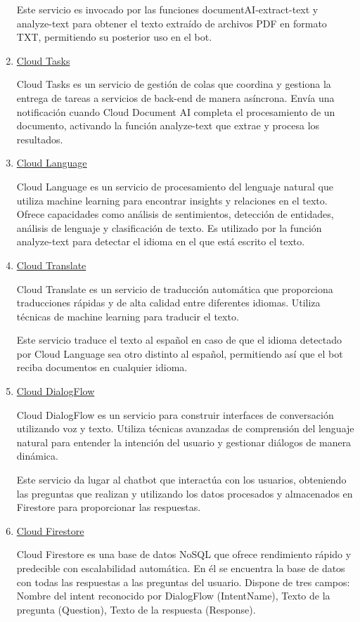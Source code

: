 \begin{enumerate}
    Este servicio es invocado por las funciones documentAI-extract-text y analyze-text para obtener el texto extraído de archivos PDF en formato TXT, permitiendo su posterior uso en el bot.
    
    \item \underline{Cloud Tasks}
    
    Cloud Tasks es un servicio de gestión de colas que coordina y gestiona la entrega de tareas a servicios de back-end de manera asíncrona. Envía una notificación cuando Cloud Document AI completa el procesamiento de un documento, activando la función analyze-text que extrae y procesa los resultados.
    
    \item \underline{Cloud Language}
    
    Cloud Language es un servicio de procesamiento del lenguaje natural que utiliza machine learning para encontrar insights y relaciones en el texto. Ofrece capacidades como análisis de sentimientos, detección de entidades, análisis de lenguaje y clasificación de texto. Es utilizado por la función analyze-text para detectar el idioma en el que está escrito el texto.
    
    \item \underline{Cloud Translate}
    
    Cloud Translate es un servicio de traducción automática que proporciona traducciones rápidas y de alta calidad entre diferentes idiomas. Utiliza técnicas de machine learning para traducir el texto.
    
    Este servicio traduce el texto al español en caso de que el idioma detectado por Cloud Language sea otro distinto al español, permitiendo así que el bot reciba documentos en cualquier idioma.
    
    \item \underline{Cloud DialogFlow}
    
    Cloud DialogFlow es un servicio para construir interfaces de conversación utilizando voz y texto. Utiliza técnicas avanzadas de comprensión del lenguaje natural para entender la intención del usuario y gestionar diálogos de manera dinámica.
    
    Este servicio da lugar al chatbot que interactúa con los usuarios, obteniendo las preguntas que realizan y utilizando los datos procesados y almacenados en Firestore para proporcionar las respuestas.
    
    \item \underline{Cloud Firestore}
    
    Cloud Firestore es una base de datos NoSQL que ofrece rendimiento rápido y predecible con escalabilidad automática. En él se encuentra la base de datos con todas las respuestas a las preguntas del usuario. Dispone de tres campos: Nombre del intent reconocido por DialogFlow (IntentName), Texto de la pregunta (Question), Texto de la respuesta (Response).
    
\end{enumerate}

